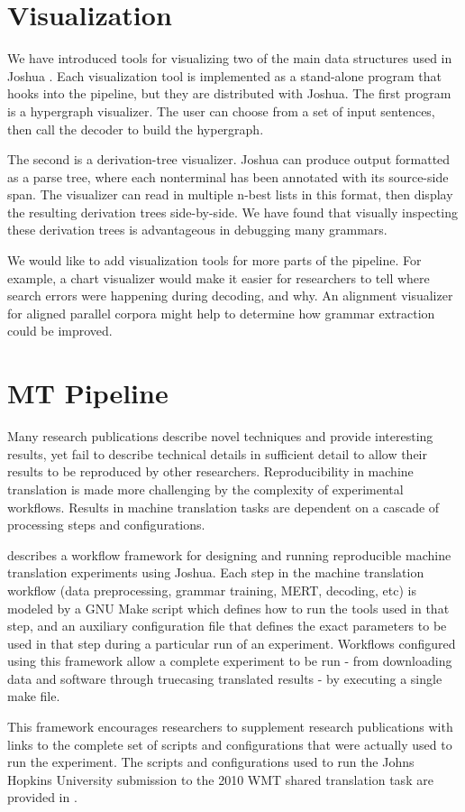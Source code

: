 \documentclass[11pt]{article}
\begin{document}
\section{Visualization}

We have introduced tools for visualizing two of the main data structures used
in Joshua \cite{PBML-2010-Josua-visualization}. Each visualization tool is implemented as a
stand-alone program that hooks into the pipeline, but they are distributed with
Joshua. The first program is a hypergraph visualizer. The user can choose from
a set of input sentences, then call the decoder to build the hypergraph.

The second is a derivation-tree visualizer. Joshua can produce output formatted
as a parse tree, where each nonterminal has been annotated with its source-side
span. The visualizer can read in multiple n-best lists in this format, then
display the resulting derivation trees side-by-side. We have found that
visually inspecting these derivation trees is advantageous in debugging many
grammars.

We would like to add visualization tools for more parts of the pipeline. For
example, a chart visualizer would make it easier for researchers to tell where
search errors were happening during decoding, and why. An alignment visualizer
for aligned parallel corpora might help to determine how grammar extraction 
could be improved.


\section{MT Pipeline}

Many research publications describe novel techniques and provide interesting results, yet fail to describe technical details in sufficient detail to allow their results to be reproduced by other researchers. Reproducibility in machine translation is made more challenging by the complexity of experimental workflows. Results in machine translation tasks are dependent on a cascade of processing steps and configurations. 

 describes a workflow framework for designing and running reproducible machine translation experiments using Joshua. Each step in the machine translation workflow (data preprocessing, grammar training, MERT, decoding, etc) is modeled by a GNU Make script which defines how to run the tools used in that step, and an auxiliary configuration file that defines the exact parameters to be used in that step during a particular run of an experiment. Workflows configured using this framework allow a complete experiment to be run - from downloading data and software through truecasing translated results - by executing a single make file.

This framework encourages researchers to supplement research publications with links to the complete set of scripts and configurations that were actually used to run the experiment. The scripts and configurations used to run the Johns Hopkins University submission to the 2010 WMT shared translation task are provided in .



\end{document}
